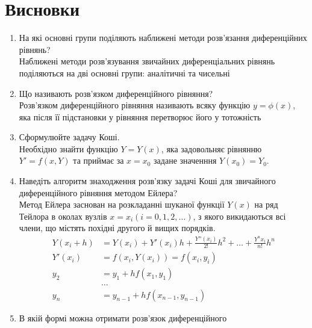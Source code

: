 \section{Висновки}
\label{sec:summary}

\begin{enumerate}
      \item На які основні групи поділяють наближені методи
            розв’язання диференційних рівнянь? \\
            Наближені методи розв'язування звичайних диференціальних
            рівнянь поділяються на дві основні групи:
            аналітичні та чисельні
      \item Що називають розв’язком диференційного рівняння? \\
            Розв'язком диференційного рівняння називають всяку
            функцію $y = \phi (x)$, яка після її підстановки у
            рівняння перетворює його у тотожність
      \item Сформулюйте задачу Коші. \\
            Необхідно знайти функцію $Y = Y(x)$, яка задовольняє
            рівнянню $Y' = f(x, Y)$ та приймає за $x = x_0$ задане
            значенння $Y(x_0) = Y_0$.
      \item Наведіть алгоритм знаходження розв’язку задачі Коші для
            звичайного диференційного рівняння методом Ейлера? \\
            Метод Ейлера заснован на розкладанні шуканої функції
            $Y(x)$ на ряд Тейлора в околах вузлів $x = x_i (i = 0, 1, 2, \dots)$,
            з якого викидаються всі члени, що містять похідні другого й вищих порядків.
            \begin{align}
                  Y(x_i + h) & = Y(x_i) + Y'(x_i) h + \frac{Y''(x_i)}{2!} h^2 + \dots + \frac{Y^n x_i}{n!} h^n \\
                  Y'(x_i)    & = f(x_i, Y(x_i)) = f(x_i, y_i)                                                  \\
                  y_2        & = y_1 + h f(x_1, y_1)                                                           \\
                             & \dots                                                                           \\
                  y_n        & = y_{n - 1} + h f(x_{n - 1}, y_{n - 1})
            \end{align}
      \item В якій формі можна отримати розв’язок диференційного

\end{enumerate}
